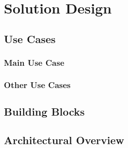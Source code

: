 \chapter{Solution Design}
\label{chapter:sol-design}

\section{Use Cases}
\label{sec:use-cases}

\subsection{Main Use Case}
\label{subsec:main-usecase}

\subsection{Other Use Cases}
\label{subsec:other-usecases}

\section{Building Blocks}
\label{sec:building-blocks}

\section{Architectural Overview}
\label{sec:arch-overview}
